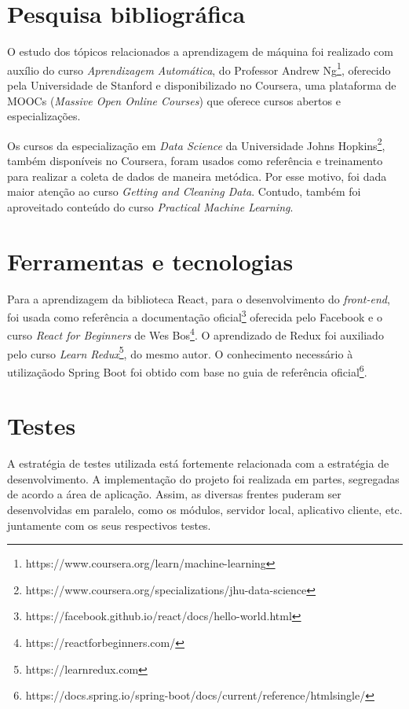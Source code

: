 \section{Pesquisa bibliográfica}

O estudo dos tópicos relacionados a aprendizagem de máquina foi realizado com auxílio do curso \emph{Aprendizagem Automática}, do Professor Andrew Ng\footnote{ https://www.coursera.org/learn/machine-learning}, oferecido pela Universidade de Stanford e disponibilizado no Coursera, uma plataforma de MOOCs (\textit{Massive Open Online Courses}) que oferece cursos abertos e especializações.

Os cursos da especialização em \textit{Data Science} da Universidade Johns Hopkins\footnote{ https://www.coursera.org/specializations/jhu-data-science}, também disponíveis no Coursera, foram usados como referência e treinamento para realizar a coleta de dados de maneira metódica. Por esse motivo, foi dada maior atenção ao curso \textit{Getting and Cleaning Data}. Contudo, também foi aproveitado conteúdo do curso \textit{Practical Machine Learning}.

\section{Ferramentas e tecnologias}

Para a aprendizagem da biblioteca React, para o desenvolvimento do \emph{front-end}, foi usada como referência a documentação oficial\footnote{https://facebook.github.io/react/docs/hello-world.html} oferecida pelo Facebook e o curso \textit{React for Beginners} de Wes Bos\footnote{ https://reactforbeginners.com/}. O aprendizado de Redux foi auxiliado pelo curso \textit{Learn Redux}\footnote{https://learnredux.com}, do mesmo autor. O conhecimento necessário à utilizaçãodo Spring Boot foi obtido com base no guia de referência oficial\footnote{https://docs.spring.io/spring-boot/docs/current/reference/htmlsingle/}.

\section{Testes}

A estratégia de testes utilizada está fortemente relacionada com a estratégia de desenvolvimento. A implementação do projeto foi realizada em partes, segregadas de acordo a área de aplicação. Assim, as diversas frentes puderam ser desenvolvidas em paralelo, como os módulos, servidor local, aplicativo cliente, etc. juntamente com os seus respectivos testes.

